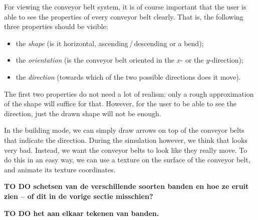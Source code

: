 For viewing the conveyor belt system, it is of course important that the user is able to see the properties of every conveyor belt clearly. That is, the following three properties should be visible:
\begin{itemize}
 \item the \textit{shape} (is it horizontal, ascending\,/\,descending or a bend);
 \item the \textit{orientation} (is the conveyor belt oriented in the $x$- or the $y$-direction);
 \item the \textit{direction} (towards which of the two possible directions does it move).
\end{itemize}
The first two properties do not need a lot of realism: only a rough approximation of the shape will suffice for that. However, for the user to be able to see the direction, just the drawn shape will not be enough.

In the building mode, we can simply draw arrows on top of the conveyor belts that indicate the direction. During the simulation however, we think that looks very bad. Instead, we want the conveyor belts to look like they really move. To do this in an easy way, we can use a texture on the surface of the conveyor belt, and animate its texture coordinates.

\textbf{TO DO schetsen van de verschillende soorten banden en hoe ze eruit zien -- of dit in de vorige sectie misschien?}

\textbf{TO DO het aan elkaar tekenen van banden.}
